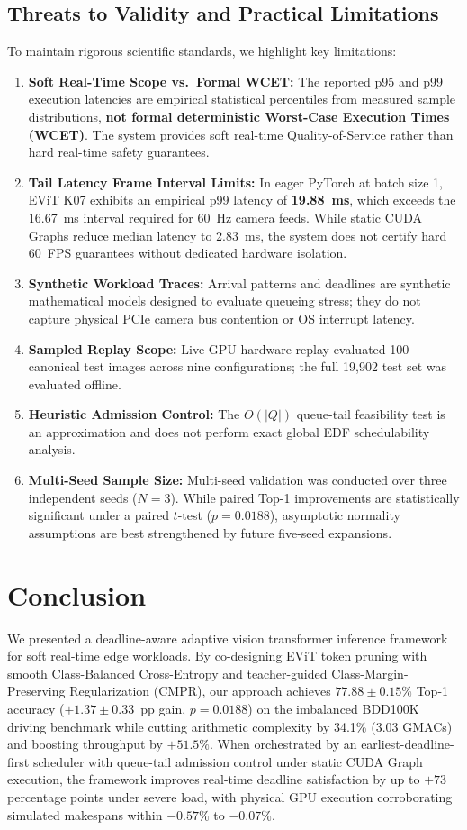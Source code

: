 \documentclass[conference]{IEEEtran}
\begin{document}
\subsection{Threats to Validity and Practical Limitations}
To maintain rigorous scientific standards, we highlight key limitations:
\begin{enumerate}
    \item \textbf{Soft Real-Time Scope vs.\ Formal WCET:} The reported p95 and p99 execution latencies are empirical statistical percentiles from measured sample distributions, \textbf{not formal deterministic Worst-Case Execution Times (WCET)}. The system provides soft real-time Quality-of-Service rather than hard real-time safety guarantees.
    \item \textbf{Tail Latency Frame Interval Limits:} In eager PyTorch at batch size 1, EViT K07 exhibits an empirical p99 latency of \textbf{19.88~ms}, which exceeds the 16.67~ms interval required for 60~Hz camera feeds. While static CUDA Graphs reduce median latency to 2.83~ms, the system does not certify hard 60~FPS guarantees without dedicated hardware isolation.
    \item \textbf{Synthetic Workload Traces:} Arrival patterns and deadlines are synthetic mathematical models designed to evaluate queueing stress; they do not capture physical PCIe camera bus contention or OS interrupt latency.
    \item \textbf{Sampled Replay Scope:} Live GPU hardware replay evaluated 100 canonical test images across nine configurations; the full 19,902 test set was evaluated offline.
    \item \textbf{Heuristic Admission Control:} The $O(|Q|)$ queue-tail feasibility test is an approximation and does not perform exact global EDF schedulability analysis.
    \item \textbf{Multi-Seed Sample Size:} Multi-seed validation was conducted over three independent seeds ($N=3$). While paired Top-1 improvements are statistically significant under a paired $t$-test ($p = 0.0188$), asymptotic normality assumptions are best strengthened by future five-seed expansions.
\end{enumerate}

\section{Conclusion}
We presented a deadline-aware adaptive vision transformer inference framework for soft real-time edge workloads. By co-designing EViT token pruning with smooth Class-Balanced Cross-Entropy and teacher-guided Class-Margin-Preserving Regularization (CMPR), our approach achieves $77.88 \pm 0.15\%$ Top-1 accuracy ($+1.37 \pm 0.33$~pp gain, $p = 0.0188$) on the imbalanced BDD100K driving benchmark while cutting arithmetic complexity by 34.1\% (3.03 GMACs) and boosting throughput by $+51.5\%$. When orchestrated by an earliest-deadline-first scheduler with queue-tail admission control under static CUDA Graph execution, the framework improves real-time deadline satisfaction by up to $+73$ percentage points under severe load, with physical GPU execution corroborating simulated makespans within $-0.57\%$ to $-0.07\%$.



\end{document}
